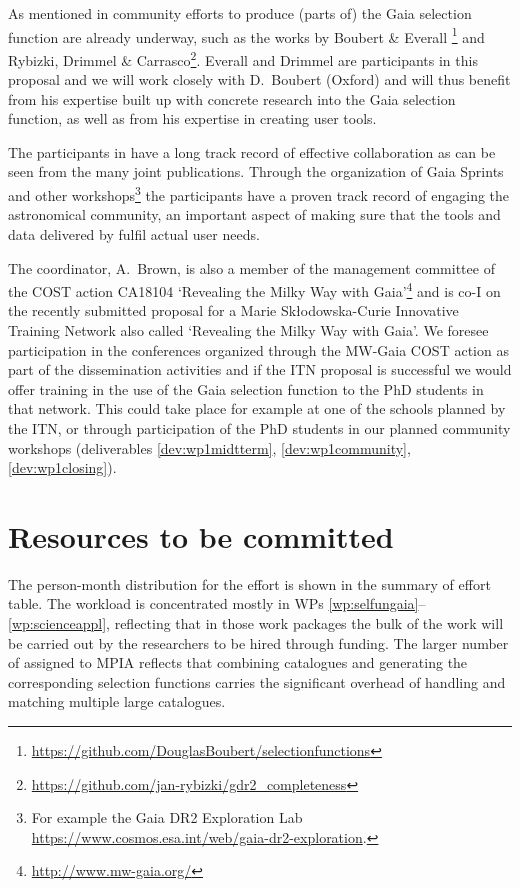 As mentioned in  community efforts to produce (parts of) the Gaia selection function are already underway, such as the works by Boubert \& Everall \cite{Boubert2020a, Boubert2020b}\footnote{\url{https://github.com/DouglasBoubert/selectionfunctions}} and Rybizki, Drimmel \& Carrasco\footnote{\url{https://github.com/jan-rybizki/gdr2_completeness}}. Everall and Drimmel are participants in this proposal and we will work closely with D.~Boubert (Oxford) and will thus benefit from his expertise built up with concrete research into the Gaia selection function, as well as from his expertise in creating user tools.

The participants in {\acro} have a long track record of effective collaboration as can be seen from the many joint publications. Through the organization of Gaia Sprints and other workshops\footnote{For example the Gaia DR2 Exploration Lab \url{https://www.cosmos.esa.int/web/gaia-dr2-exploration}.} the participants have a proven track record of engaging the astronomical community, an important aspect of making sure that the tools and data delivered by {\acro} fulfil actual user needs.

The coordinator, A.~Brown, is also a member of the management committee of the COST action CA18104 `Revealing the Milky Way with Gaia'\footnote{\url{http://www.mw-gaia.org/}} and is co-I on the recently submitted proposal for a Marie Sk\l{}odowska-Curie Innovative Training Network also called `Revealing the Milky Way with Gaia'. We foresee participation in the conferences organized through the MW-Gaia COST action as part of the dissemination activities and if the ITN proposal is successful we would offer training in the use of the Gaia selection function to the PhD students in that network. This could take place for example at one of the schools planned by the ITN, or through participation of the PhD students in our planned community workshops (deliverables \ref{dev:wp1midtterm}, \ref{dev:wp1community}, \ref{dev:wp1closing}).

\section{Resources to be committed}
\label{sec:resources}

The person-month distribution for the {\acro} effort is shown in the summary of effort table. The workload is concentrated mostly in WPs \ref{wp:selfungaia}--\ref{wp:scienceappl}, reflecting that in those work packages the bulk of the work will be carried out by the researchers to be hired through {\acro} funding. The larger number of {\pems} assigned to MPIA reflects that combining catalogues and generating the corresponding selection functions carries the significant overhead of handling and matching multiple large catalogues.

